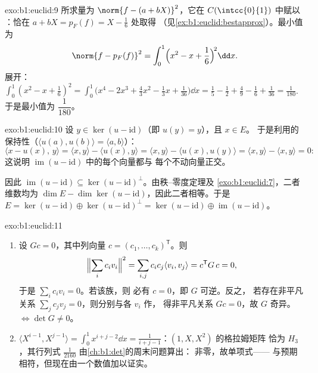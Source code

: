 \begin{solution}{exo:b1:euclid:9}
所求量为 $\norm{f - (a + bX)}^2$，它在 $C(\intcc{0}{1})$ 中赋以
：恰在
 $a + bX = p_F(f) = X - \frac16$ 处取得
（见\cref{ex:b1:euclid:bestapprox}）。最小值为
\[
\norm{f - p_F(f)}^2 = \int_0^1 \Bigl(x^2 - x + \frac16\Bigr)^{\!2}
\dd x .
\]
展开：$\int_0^1 (x^2 - x + \frac16)^2 = \int_0^1 \bigl(x^4 - 2x^3
+ \frac{4}{3}x^2 - \frac13 x + \frac{1}{36}\bigr)\dd x = \frac15 -
\frac12 + \frac49 - \frac16 + \frac{1}{36} = \frac{1}{180}$.
于是最小值为 $\dfrac{1}{180}$。
\end{solution}

\begin{solution}{exo:b1:euclid:10}
设 $y \in \ker(u - \mathrm{id})$（即 $u(y) = y$），且 $x \in E$。
于是利用的保持性（$\langle u(a),
u(b)\rangle = \langle a, b\rangle$）：
\[
\langle x - u(x),\, y\rangle
= \langle x, y\rangle - \langle u(x), y\rangle
= \langle x, y\rangle - \langle u(x), u(y)\rangle
= \langle x, y\rangle - \langle x, y\rangle = 0 :
\]
这说明 $\operatorname{im}(u - \mathrm{id})$ 中的每个向量都与
每个不动向量正交。

因此 $\operatorname{im}(u - \mathrm{id}) \subseteq \ker(u -
\mathrm{id})^{\perp}$。由秩--零度定理及
\cref{exo:b1:euclid:7}，二者维数均为 $\dim E - \dim\ker(u -
\mathrm{id})$，因此二者相等。于是 $E = \ker(u - \mathrm{id})
\oplus \ker(u - \mathrm{id})^\perp = \ker(u - \mathrm{id}) \oplus
\operatorname{im}(u - \mathrm{id})$。
\end{solution}

\begin{solution}{exo:b1:euclid:11}
\begin{enumerate}
  \item 设 $Gc = 0$，其中列向量 $c = (c_1, \dots,
        c_k)^{\mathsf T}$。则
        \[
        \Bigl\lVert\sum_i c_i v_i\Bigr\rVert^2
        = \sum_{i,j} c_i c_j \langle v_i, v_j\rangle
        = c^{\mathsf T} G\, c = 0,
        \]
        于是 $\sum_i c_i v_i = 0$。若该族，则
        必有 $c = 0$，即 $G$ 可逆。反之，
        若存在非平凡关系 $\sum_j c_j v_j = 0$，则分别与各 $v_i$ 作，
        得非平凡关系
        $Gc = 0$，故 $G$ 奇异。 $\iff \det G \neq 0$。
  \item $\langle X^{i-1}, X^{j-1}\rangle = \int_0^1 x^{i+j-2}\dd
        x = \frac{1}{i+j-1}$：$(1, X, X^2)$ 的格拉姆矩阵
        恰为 $H_3$，其行列式
        $\frac1{2160}$ 由\cref{ch:b1:det}的周末问题算出：
        非零，故单项式——
        与预期相符，但现在由一个数值加以证实。
\end{enumerate}
\end{solution}

